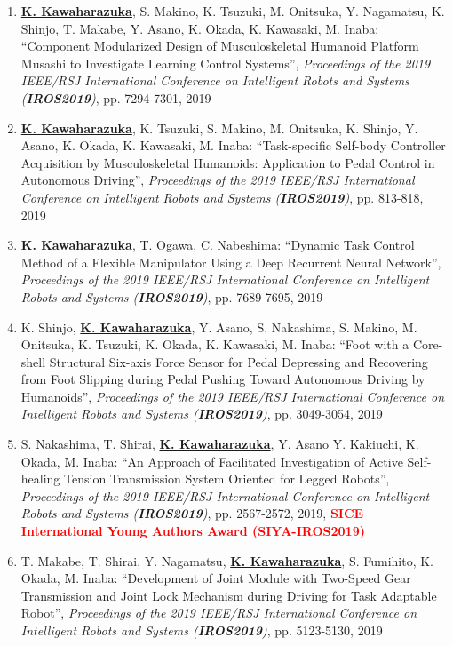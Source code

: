 \documentclass[letterpaper]{article}
\begin{document}
\begin{enumerate}
\item \underline{\textbf{K. Kawaharazuka}}, S. Makino, K. Tsuzuki, M. Onitsuka, Y. Nagamatsu, K. Shinjo, T. Makabe, Y. Asano, K. Okada, K. Kawasaki, M. Inaba: ``Component Modularized Design of Musculoskeletal Humanoid Platform Musashi to Investigate Learning Control Systems'', \textit{Proceedings of the 2019 IEEE/RSJ International Conference on Intelligent Robots and Systems (\textit{\textbf{IROS2019}})}, pp. 7294-7301, 2019
\item \underline{\textbf{K. Kawaharazuka}}, K. Tsuzuki, S. Makino, M. Onitsuka, K. Shinjo, Y. Asano, K. Okada, K. Kawasaki, M. Inaba: ``Task-specific Self-body Controller Acquisition by Musculoskeletal Humanoids: Application to Pedal Control in Autonomous Driving'', \textit{Proceedings of the 2019 IEEE/RSJ International Conference on Intelligent Robots and Systems (\textit{\textbf{IROS2019}})}, pp. 813-818, 2019
\item \underline{\textbf{K. Kawaharazuka}}, T. Ogawa, C. Nabeshima: ``Dynamic Task Control Method of a Flexible Manipulator Using a Deep Recurrent Neural Network'', \textit{Proceedings of the 2019 IEEE/RSJ International Conference on Intelligent Robots and Systems (\textit{\textbf{IROS2019}})}, pp. 7689-7695, 2019
\item K. Shinjo, \underline{\textbf{K. Kawaharazuka}}, Y. Asano, S. Nakashima, S. Makino, M. Onitsuka, K. Tsuzuki, K. Okada, K. Kawasaki, M. Inaba: ``Foot with a Core-shell Structural Six-axis Force Sensor for Pedal Depressing and Recovering from Foot Slipping during Pedal Pushing Toward Autonomous Driving by Humanoids'', \textit{Proceedings of the 2019 IEEE/RSJ International Conference on Intelligent Robots and Systems (\textit{\textbf{IROS2019}})}, pp. 3049-3054, 2019
\item S. Nakashima, T. Shirai, \underline{\textbf{K. Kawaharazuka}}, Y. Asano Y. Kakiuchi, K. Okada, M. Inaba: ``An Approach of Facilitated Investigation of Active Self-healing Tension Transmission System Oriented for Legged Robots'', \textit{Proceedings of the 2019 IEEE/RSJ International Conference on Intelligent Robots and Systems (\textit{\textbf{IROS2019}})}, pp. 2567-2572, 2019, \textbf{\textcolor{red}{SICE International Young Authors Award (SIYA-IROS2019)}}
\item T. Makabe, T. Shirai, Y. Nagamatsu, \underline{\textbf{K. Kawaharazuka}}, S. Fumihito, K. Okada, M. Inaba: ``Development of Joint Module with Two-Speed Gear Transmission and Joint Lock Mechanism during Driving for Task Adaptable Robot'', \textit{Proceedings of the 2019 IEEE/RSJ International Conference on Intelligent Robots and Systems (\textit{\textbf{IROS2019}})}, pp. 5123-5130, 2019

\end{enumerate}
\end{document}
